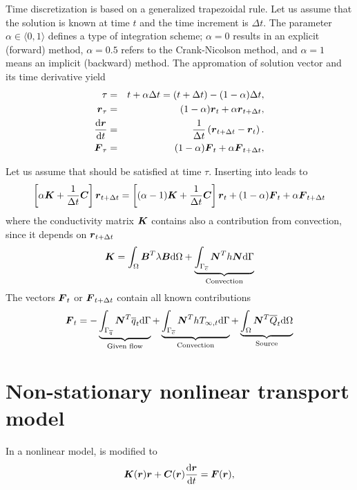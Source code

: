 Time discretization is based on a generalized trapezoidal rule. Let us assume that the solution is known at time $t$ and the time increment is $\Delta t$. The parameter $\alpha\in\langle 0, 1\rangle$ defines a type of integration scheme; $\alpha=0$ results in an explicit (forward) method, $\alpha=0.5$ refers to the Crank-Nicolson method, and $\alpha=1$ means an implicit (backward) method. The appromation of solution vector and its time derivative yield
\begin{eqnarray}
\tau &=& t+\alpha\Delta t = (t+\Delta t) - (1-\alpha)\Delta t,\label{NonLinTrans:2}\\
\mbox{\boldmath$r$}_{\tau} &=& (1-\alpha)\mbox{\boldmath$r$}_t+\alpha\mbox{\boldmath$r$}_{t+\Delta t},\label{NonLinTrans:3}\\
\frac{{\rm d}\mbox{\boldmath$r$}}{{\rm d} t} &=& \frac{1}{\Delta t}\left(\mbox{\boldmath$r$}_{t+\Delta t}-\mbox{\boldmath$r$}_t\right).\label{NonLinTrans:4}\\
\mbox{\boldmath$F$}_{\tau} &=& (1-\alpha)\mbox{\boldmath$F$}_t+\alpha\mbox{\boldmath$F$}_{t+\Delta t},\label{NonLinTrans:5}
\end{eqnarray}

Let us assume that  should be satisfied at time $\tau$. Inserting 
into  leads to
\begin{eqnarray}
\left[\alpha \mbox{\boldmath$K$} + \frac{1}{\Delta t} \mbox{\boldmath$C$} \right] \mbox{\boldmath$r$}_{t+\Delta t} = 
\left[(\alpha-1) \mbox{\boldmath$K$} + \frac{1}{\Delta t} \mbox{\boldmath$C$} \right] \mbox{\boldmath$r$}_{t} +
(1-\alpha) \mbox{\boldmath$F$}_{t} + \alpha \mbox{\boldmath$F$}_{t+\Delta t}\label{NonLinTrans:6}
\end{eqnarray}
where the conductivity matrix $\mbox{\boldmath$K$}$ contains also a contribution from convection, since it depends on
$\mbox{\boldmath$r$}_{t+\Delta t}$
\begin{eqnarray}
\mbox{\boldmath$K$} = \int_{\Omega}\mbox{\boldmath$B$}^T \lambda \mbox{\boldmath$B$} \mathrm{d}\Omega + \underbrace{\int_{{\Gamma}_{\overline{c}}} \mbox{\boldmath$N$}^T h \mbox{\boldmath$N$} \mathrm{d} \Gamma}_{\textrm{Convection}}\label{NonLinTrans:7}
\end{eqnarray}
The vectors $\mbox{\boldmath$F$}_t$ or $\mbox{\boldmath$F$}_{t+\Delta t}$ contain all known contributions
\begin{eqnarray}
\mbox{\boldmath$F$}_t = - \underbrace{\int_{\Gamma_{\overline{q}}} \mbox{\boldmath$N$}^T \overline{q}_t \mathrm{d} \Gamma}_{\textrm{Given flow}} +
\underbrace{\int_{\Gamma_{\overline{c}}} \mbox{\boldmath$N$}^T h T_{\infty,t} \mathrm{d} \Gamma}_{\textrm{Convection}} +
\underbrace{\int_{\Omega}\mbox{\boldmath$N$}^T\overline{Q}_t\mathrm{d}\Omega}_{\textrm{Source}}\label{NonLinTrans:8}
\end{eqnarray}

\section{Non-stationary nonlinear transport model}
\label{NonNonTrans}
In a nonlinear model,  is modified to
\begin{eqnarray}
\mbox{\boldmath$K$}(\mbox{\boldmath$r$}) \mbox{\boldmath$r$} + \mbox{\boldmath$C$}(\mbox{\boldmath$r$})\frac{{\rm d}\mbox{\boldmath$r$}}{{\rm d} t} = \mbox{\boldmath$F$}(\mbox{\boldmath$r$})\label{NonNonTrans:1},
\end{eqnarray}

